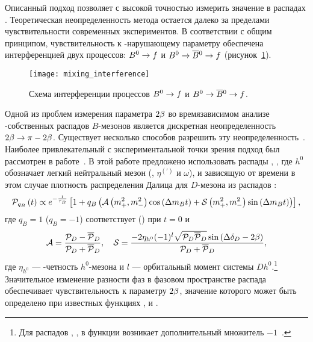 Описанный подход позволяет с высокой точностью измерить значение \sindbeta в распадах \bjpsiks.  Теоретическая неопределенность метода остается далеко за пределами чувствительности современных экспериментов.  В соответствии с общим принципом, чувствительность к \cpconj-нарушающему параметру обеспечена интерференцией двух процессов: $B^0\to f$ и $B^0\to\overline{B}{}^0\to f$ (рисунок~\ref{fig:mixint}).

\begin{figure}[htb]
  \centering
  \texttt{[image: mixing\_interference]}
  \caption{Схема интерференции процессов $B^0\to f$ и $B^0\to\overline{B}{}^0\to f$.}
  \label{fig:mixint}
\end{figure}

Одной из проблем измерения параметра $2\beta$ во времязависимом анализе \cpconj-собственных распадов $B$-мезонов является дискретная неопределенность $2\beta\to\pi-2\beta$.  Существует несколько способов разрешить эту неопределенность~\cite{Charles1998375,PhysRevD.56.7259,PhysRevD.61.116012}.  Наиболее привлекательный с экспериментальной точки зрения подход был рассмотрен в работе~\cite{bondar_gershon_krokovny}.  В этой работе предложено использовать распады \bdh, \dbkpp, где $h^0$ обозначает легкий нейтральный мезон (\pin, $\eta^{(\prime)}$ и $\omega$), и зависящую от времени в этом случае плотность распределения Далица для $D$-мезона из распадов \bdh:
\begin{equation}\label{eq:beta-dalitz-model-dep}
 \mathcal{P}_{q_B}\left(t\right) \propto e^{-\frac{t}{\tau_B}} \left[1 + q_B \left( \mathcal{A}\left(m_+^2,m_-^2\right)\cos{\ensuremath{\left(\Delta m_B t\right)}} + \mathcal{S}\left(m_+^2,m_-^2\right)\sin{\ensuremath{\left(\Delta m_B t\right)}} \right)\right],
\end{equation}
где $q_B = 1$ ($q_B = -1$) соответствует \bn (\bnbar) при $t=0$ и
\begin{equation}
  \mca = \frac{\mcpd - \mcpdbar}{\mcpd + \mcpdbar},\quad
  \mcs = \frac{-2\eta_{h^0}(-1)^l\sqrt{\mcpd\mcpdbar}\sin{\left(\deld-2\pphi\right)}}{\mcpd + \mcpdbar},
\end{equation}
где $\eta_{h^0}$ --- \cpconj-четность $h^0$-мезона и $l$ --- орбитальный момент системы $Dh^0$.\footnote{Для распадов \bdstarh, \dbstdbpi, \dbkpp в функции \mcs возникает дополнительный множитель $-1$~\cite{bondar_gershon}.}  Значительное изменение разности фаз \deld в фазовом пространстве распада \dnkpp обеспечивает чувствительность к параметру $2\beta$, значение которого может быть определено при известных функциях \mcpd, \mcpdbar и \deld.


